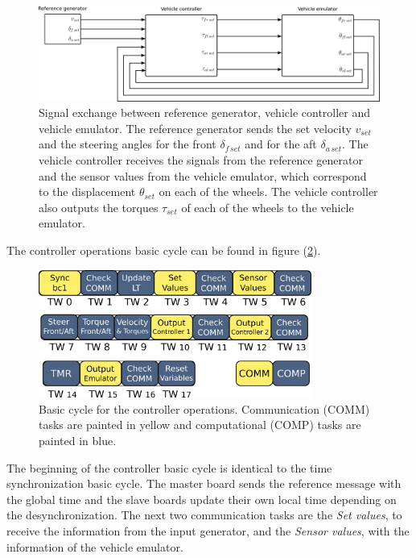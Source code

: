 \documentclass[table,xcdraw]{article}
\begin{document}
\begin{figure}[h!]
    \centering
    \includegraphics[width=\textwidth]{figures/methodology/signals_scheme.png}
    \caption{Signal exchange between reference generator, vehicle controller and vehicle emulator. The reference generator sends the set velocity $v_{set}$ and the steering angles for the front $\delta_{f\,set}$ and for the aft $\delta_{a\,set}$. The vehicle controller receives the signals from the reference generator and the sensor values from the vehicle emulator, which correspond to the displacement $\theta_{set}$ on each of the wheels. The vehicle controller also outputs the torques $\tau_{set}$ of each of the wheels to the vehicle emulator.}
    \label{fig:controller_signals}
\end{figure}


The controller operations basic cycle can be found in figure (\ref{fig:controller_basic_cycle}).

\begin{figure}[h!]
    \centering
    \includegraphics[width=0.8\textwidth]{figures/methodology/basic_cycle_controller.png}
    \caption{Basic cycle for the controller operations. Communication (COMM) tasks are painted in yellow and computational (COMP) tasks are painted in blue.}
    \label{fig:controller_basic_cycle}
\end{figure}

The beginning of the controller basic cycle is identical to the time synchronization basic cycle. The master board sends the reference message with the global time and the slave boards update their own local time depending on the desynchronization. The next two communication tasks are the \textit{Set values}, to receive the information from the input generator, and the \textit{Sensor values}, with the information of the vehicle emulator.\\
\end{document}
